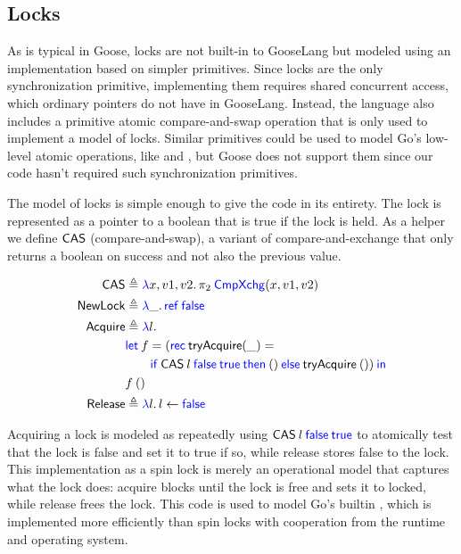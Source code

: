 \subsection{Locks}

\newcommand{\Acquire}{\goosedef{Acquire}}
\newcommand{\CAS}{\goosedef{CAS}}

As is typical in Goose, locks are not built-in to GooseLang but modeled
using an implementation based on simpler primitives. Since locks are the
only synchronization primitive, implementing them requires shared
concurrent access, which ordinary pointers do not have in GooseLang.
Instead, the language also includes a primitive atomic compare-and-swap
operation that is only used to implement a model of locks. Similar primitives
could be used to model Go's low-level atomic operations, like
 and , but Goose does not
support them since our code hasn't required such synchronization primitives.

The model of locks is simple enough to give the code in its entirety. The lock
is represented as a pointer to a boolean that is true if the lock is held. As a
helper we define $\CAS$ (compare-and-swap), a variant of compare-and-exchange
that only returns a boolean on success and not also the previous value.

\begin{align*}
  \CAS &\defeq \gooselambda{x, v1, v2} \pi_{2}\app \goosekw{CmpXchg}(x, v1, v2) \\
  \goosedef{NewLock} & \defeq \gooselambda{\_} \goosekw{ref} \app \goosekw{false} \\
  \Acquire &\defeq \gooselambda{l} \\
       &\goosekw{let}\app f = (\goosekw{rec}\: \textlog{tryAcquire}(\_) = \\
       &\qquad \gooseif{\CAS \app l \app \goosekw{false} \app \goosekw{true}}%
         {()}{\textlog{tryAcquire} \app ()}) \app\goosekw{in} \\
       &f \app () \\
  \goosedef{Release} &\defeq \gooselambda{l} l \gets \goosekw{false} \\
\end{align*}

Acquiring a lock is modeled as repeatedly using
$\CAS \app l \app \goosekw{false} \app \goosekw{true}$ to
atomically test that the lock is false and set it to true if so, while release
stores false to the lock. This implementation as a spin lock is merely an
operational model that captures what the lock does: acquire blocks until the
lock is free and sets it to locked, while release frees the lock. This code is
used to model Go's builtin , which is implemented more
efficiently than spin locks with cooperation from the runtime and operating
system.

